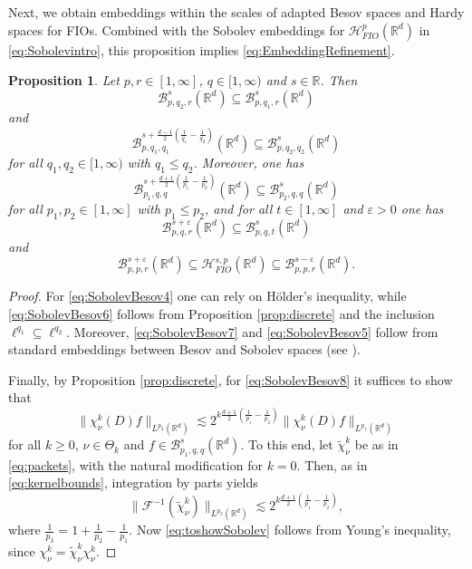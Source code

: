 \documentclass{amsart}
\newtheorem{proposition}[theorem]{Proposition}
\theoremstyle{definition}
\newcommand{\R}{\mathbb{R}}
\newcommand {\Rd}{\mathbb{R}^{d}}
\newcommand {\Hp}{\mathcal{H}^{p}_{FIO}(\Rd)}
\newcommand {\Hps}{\mathcal{H}^{s,p}_{FIO}(\Rd)}
\newcommand {\Ba}{\mathcal{B}}
\newcommand {\F}{{\mathcal{F}}}
\newcommand {\veps}{\varepsilon}
\numberwithin{equation}{section}
\begin{document}
Next, we obtain embeddings within the scales of adapted Besov spaces and Hardy spaces for FIOs. Combined with the Sobolev embeddings for $\Hp$ in \eqref{eq:Sobolevintro}, this proposition implies \eqref{eq:EmbeddingRefinement}. 


\begin{proposition}\label{prop:Sobolev2}
Let $p,r\in[1,\infty]$, $q\in[1,\infty)$ and $s\in\R$. Then 
\begin{equation}\label{eq:SobolevBesov4}
\Ba^{s}_{p,q_{2},r}(\Rd)\subseteq \Ba^{s}_{p,q_{1},r}(\Rd)
\end{equation}
and
\begin{equation}\label{eq:SobolevBesov6}
\Ba^{s+\frac{d-1}{2}(\frac{1}{q_{1}}-\frac{1}{q_{2}})}_{p,q_{1},q_{1}}(\Rd)\subseteq \Ba^{s}_{p,q_{2},q_{2}}(\Rd)
\end{equation}
for all $q_{1},q_{2}\in[1,\infty)$ with $q_{1}\leq q_{2}$. Moreover, one has
\begin{equation}\label{eq:SobolevBesov8}
\Ba^{s+\frac{d+1}{2}(\frac{1}{p_{1}}-\frac{1}{p_{2}})}_{p_{1},q,q}(\Rd)\subseteq \Ba^{s}_{p_{2},q,q}(\Rd)
\end{equation}
for all $p_{1},p_{2}\in[1,\infty]$ with $p_{1}\leq p_{2}$, and for all $t\in[1,\infty]$ and $\veps>0$ one has
\begin{equation}\label{eq:SobolevBesov7}
\Ba^{s+\veps}_{p,q,r}(\Rd)\subseteq \Ba^{s}_{p,q,t}(\Rd)
\end{equation}
and
\begin{equation}\label{eq:SobolevBesov5}
\Ba^{s+\veps}_{p,p,r}(\Rd)\subseteq \Hps\subseteq \Ba^{s-\veps}_{p,p,r}(\Rd). 
\end{equation}
\end{proposition}
\begin{proof}
For \eqref{eq:SobolevBesov4} one can rely on H\"{o}lder's inequality, while \eqref{eq:SobolevBesov6} follows from Proposition \ref{prop:discrete} and the inclusion $\ell^{q_{1}}\subseteq \ell^{q_{2}}$.  Moreover, \eqref{eq:SobolevBesov7} and \eqref{eq:SobolevBesov5} follow from standard embeddings between Besov and Sobolev spaces (see \cite[Section 2.3.2]{Triebel10}). 

Finally, by Proposition \ref{prop:discrete}, for \eqref{eq:SobolevBesov8} it suffices to show that
\begin{equation}\label{eq:toshowSobolev}
\|\chi_{\nu}^{k}(D)f\|_{L^{p_{2}}(\Rd)}\lesssim 2^{k\frac{d+1}{2}(\frac{1}{p_{1}}-\frac{1}{p_{2}})}\|\chi^{k}_{\nu}(D)f\|_{L^{p_{1}}(\Rd)}
\end{equation}
for all $k\geq0$, $\nu\in\Theta_{k}$ and $f\in \Ba^{s}_{p_{1},q,q}(\Rd)$. To this end, let $\tilde{\chi}_{\nu}^{k}$ be as in \eqref{eq:packets}, with the natural modification for $k=0$. Then, as in \eqref{eq:kernelbounds}, integration by parts yields
\[
\|\F^{-1}(\tilde{\chi}_{\nu}^{k})\|_{L^{p_{3}}(\Rd)}\lesssim 2^{k\frac{d+1}{2}(\frac{1}{p_{1}}-\frac{1}{p_{2}})},
\]
where $\frac{1}{p_{3}}=1+\frac{1}{p_{2}}-\frac{1}{p_{1}}$. Now \eqref{eq:toshowSobolev} follows from Young's inequality, since $\chi_{\nu}^{k}=\tilde{\chi}_{\nu}^{k}\chi_{\nu}^{k}$.
\end{proof}
\end{document}
